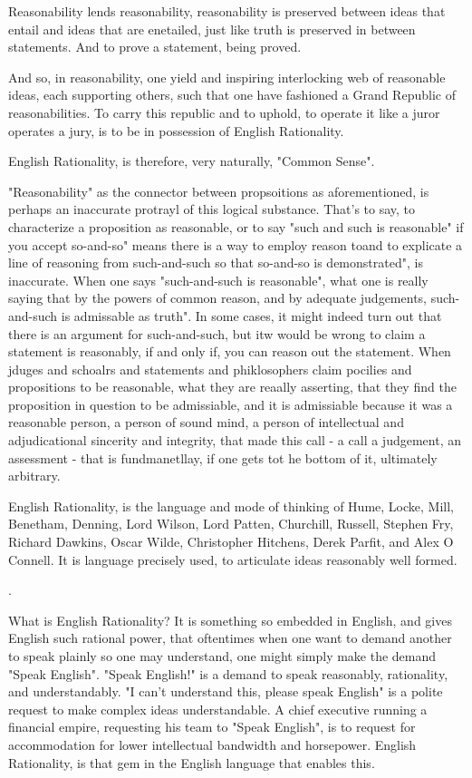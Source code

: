 Reasonability lends reasonability, reasonability is preserved between ideas that entail and ideas that are enetailed, just like truth is preserved in between statements. And to prove a statement, being proved. 


And so, in reasonability, one yield and inspiring interlocking web of reasonable ideas, each supporting others, such that one have fashioned a Grand Republic of reasonabilities. To carry this republic and to uphold, to operate it like a juror operates a jury, is to be in possession of English Rationality.
\separator

English Rationality, is therefore, very naturally, "Common Sense". 

"Reasonability" as the connector between propsoitions as aforementioned, is perhaps an inaccurate protrayl of this logical substance. That's to say, to characterize a proposition as reasonable, or to say "such and such is reasonable" if you accept so-and-so" means  there is a way to employ reason toand to explicate a line of reasoning from such-and-such so that so-and-so is demonstrated", is inaccurate. When one says "such-and-such is reasonable", what one is really saying that by the powers of common reason, and by adequate judgements, such-and-such is admissable as truth". In some cases, it might indeed turn out that there is an argument for such-and-such, but itw would be wrong to claim a statement is reasonably, if and only if, you can reason out the statement. When jduges and schoalrs and statements and phiklosophers claim pocilies and propositions to be reasonable, what they are reaally asserting, that they find the proposition in question to be admissiable, and it is admissiable because it was a reasonable person, a person of sound mind, a person of intellectual and adjudicational sincerity and integrity, that made this call - a call a judgement, an assessment - that is fundmanetllay, if one gets tot he bottom of it, ultimately arbitrary.

\separator


 English Rationality, is the language and mode of thinking of Hume, Locke, Mill, Benetham, Denning, Lord Wilson, Lord Patten, Churchill, Russell, Stephen Fry, Richard Dawkins, Oscar Wilde, Christopher Hitchens, Derek Parfit, and Alex O Connell. It is language precisely used, to articulate ideas reasonably well formed. 

\separator. 

What is English Rationality? It is something so embedded in English, and gives English such rational power, that oftentimes when one want to demand another to speak plainly so one may understand, one might simply make the demand "Speak English". "Speak English!" is a demand to speak reasonably, rationality, and understandably. "I can't understand this, please speak English" is a polite request to make complex ideas understandable. A chief executive running a financial empire, requesting his team to "Speak English", is to request for accommodation for lower intellectual bandwidth and horsepower. English Rationality, is that gem in the English language that enables this.

